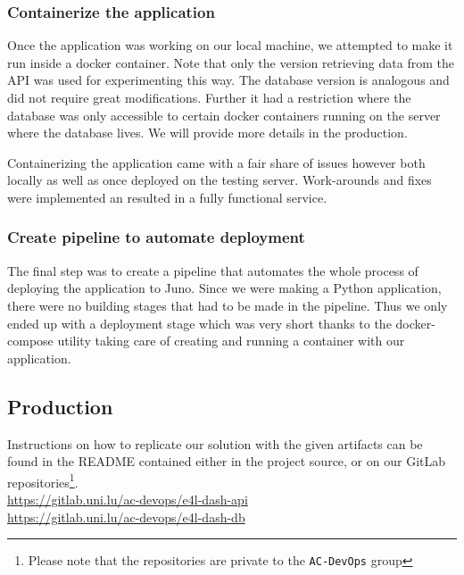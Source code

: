 \subsubsection{Containerize the application}

Once the application was working on our local machine, we attempted to make it run
inside a docker container. Note that only the version retrieving data
from the API was used for experimenting this way. The database version
is analogous and did not require great modifications. Further it had a
restriction where the database was only accessible to certain docker
containers running on the server where the database lives. We will
provide more details in the production.

Containerizing the application came with a fair share of issues
however both locally as well as once deployed on the testing server.
Work-arounds and fixes were implemented an resulted in a fully
functional service.

\subsubsection{Create pipeline to automate deployment}

The final step was to create a pipeline that automates the whole
process of deploying the application to Juno. Since we were making a
Python application, there were no building stages that had to be made
in the pipeline. Thus we only ended up with a deployment stage which
was very short thanks to the docker-compose utility taking care of
creating and running a container with our application.


\subsection{Production}




Instructions on how to replicate our solution with the given artifacts
can be found in the README contained either in the project source, or
on our GitLab repositories\footnote{Please note that the repositories
are private to the \texttt{AC-DevOps} group}.
\\\url{https://gitlab.uni.lu/ac-devops/e4l-dash-api}
\\\url{https://gitlab.uni.lu/ac-devops/e4l-dash-db}

